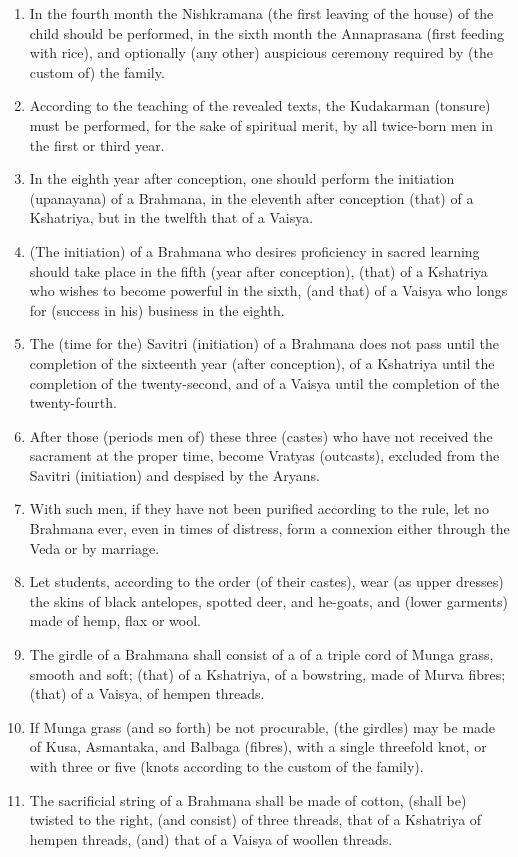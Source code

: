 \begin{enumerate}
\item In the fourth month the Nishkramana (the first leaving of the house) of the child should be performed, in the sixth month the Annaprasana (first feeding with rice), and optionally (any other) auspicious ceremony required by (the custom of) the family.
\item According to the teaching of the revealed texts, the Kudakarman (tonsure) must be performed, for the sake of spiritual merit, by all twice-born men in the first or third year.
\item In the eighth year after conception, one should perform the initiation (upanayana) of a Brahmana, in the eleventh after conception (that) of a Kshatriya, but in the twelfth that of a Vaisya.
\item (The initiation) of a Brahmana who desires proficiency in sacred learning should take place in the fifth (year after conception), (that) of a Kshatriya who wishes to become powerful in the sixth, (and that) of a Vaisya who longs for (success in his) business in the eighth.
\item The (time for the) Savitri (initiation) of a Brahmana does not pass until the completion of the sixteenth year (after conception), of a Kshatriya until the completion of the twenty-second, and of a Vaisya until the completion of the twenty-fourth.
\item After those (periods men of) these three (castes) who have not received the sacrament at the proper time, become Vratyas (outcasts), excluded from the Savitri (initiation) and despised by the Aryans.
\item With such men, if they have not been purified according to the rule, let no Brahmana ever, even in times of distress, form a connexion either through the Veda or by marriage.
\item Let students, according to the order (of their castes), wear (as upper dresses) the skins of black antelopes, spotted deer, and he-goats, and (lower garments) made of hemp, flax or wool.
\item The girdle of a Brahmana shall consist of a of a triple cord of Munga grass, smooth and soft; (that) of a Kshatriya, of a bowstring, made of Murva fibres; (that) of a Vaisya, of hempen threads.
\item If Munga grass (and so forth) be not procurable, (the girdles) may be made of Kusa, Asmantaka, and Balbaga (fibres), with a single threefold knot, or with three or five (knots according to the custom of the family).
\item The sacrificial string of a Brahmana shall be made of cotton, (shall be) twisted to the right, (and consist) of three threads, that of a Kshatriya of hempen threads, (and) that of a Vaisya of woollen threads.

\end{enumerate}
